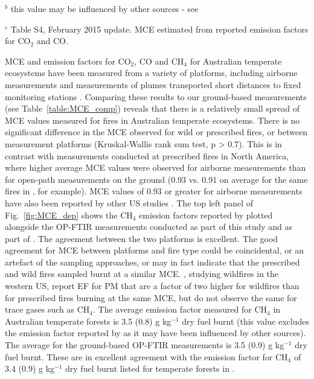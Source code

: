 \documentclass[acp, manuscript]{copernicus}
\begin{document}
\begin{table}
{$^b$ this value may be influenced by other sources - see \citet{Rea2016}

$^c$ Table S4, February 2015 update. MCE estimated from reported emission factors for CO$_2$ and CO. 
} %
 \label{table:MCE_comp}
\end{table}


MCE and emission factors for CO$_2$, CO and CH$_4$ for Australian temperate ecosystems have been measured from a variety of platforms, including airborne measurements \citep{Hurst1996} and measurements of plumes transported short distances to fixed monitoring stations \citep{Lawson2015,Rea2016}. Comparing these results to our ground-based measurements (see Table~\ref{table:MCE_comp}) reveals that there is a relatively small spread of MCE values measured for fires in Australian temperate ecosystems. %
 There is no significant difference in the MCE observed for wild or prescribed fires, or between measurement platforms (Kruskal-Wallis rank sum test, p > 0.7). This is in contrast with measurements conducted at prescribed fires in North America, where higher average MCE values were observed for airborne measurements than for open-path measurements on the ground (0.93 vs. 0.91 on average for the same fires in \citet{Akagi2014}, for example). MCE values of 0.93 or greater for airborne measurements have also been reported by other US studies \citep{Burling2011, Akagi2013}. The top left panel of Fig.~\ref{fig:MCE_dep} shows the CH$_4$ emission factors reported by \citet{Hurst1996} plotted alongside the OP-FTIR measurements conducted as part of this study and as part of \citet{Paton-Walsh2014}. The agreement between the two platforms is excellent. 
The good agreement for MCE between platforms and fire type could be coincidental, or an artefact of the sampling approaches, or may in fact indicate that the prescribed and wild fires sampled burnt at a similar MCE.  \citet{Liu2017}, studying wildfires in the western US, report EF for PM that are a factor of two higher for wildfires than for prescribed fires burning at the same MCE, but do not observe the same for trace gases such as CH$_4$.  
 The average emission factor measured for CH$_4$ in Australian temperate forests is 3.5 (0.8) g kg$^{-1}$ dry fuel burnt (this value excludes the emission factor reported by \citet{Rea2016} as it may have been influenced by other sources). The average for the ground-based OP-FTIR measurements is 3.5 (0.9) g kg$^{-1}$ dry fuel burnt. These are in excellent agreement with the emission factor for CH$_4$  of 3.4 (0.9) g kg$^{-1}$ dry fuel burnt listed for temperate forests in  \citet[Table S4, February 2015 update]{Akagi2011}. 
\end{document}
